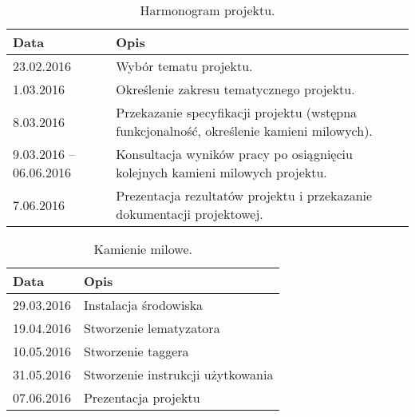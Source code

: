 \begin{table}[H]
	\centering
	\caption{Harmonogram projektu.}
	\smallskip
	\begin{tabular}{p{4cm}p{8cm}}
		\toprule
		\textbf{Data}& \textbf{Opis} \\
		\midrule
		23.02.2016 & Wybór tematu projektu. \\
		1.03.2016 & Określenie zakresu tematycznego projektu. \\
		8.03.2016 & Przekazanie specyfikacji projektu (wstępna funkcjonalność, określenie kamieni milowych). \\
		9.03.2016 -- 06.06.2016 & Konsultacja wyników pracy po osiągnięciu kolejnych kamieni milowych projektu. \\
		7.06.2016 & Prezentacja rezultatów projektu i przekazanie dokumentacji projektowej. \\
		\bottomrule
	\end{tabular}
\end{table}

	\begin{table}[H]
	\centering
	\caption{Kamienie milowe.}
	\smallskip
	\begin{tabular}{p{4cm}p{8cm}}
		\toprule
		\textbf{Data}& \textbf{Opis} \\
		\midrule
		29.03.2016 & Instalacja środowiska \\
		19.04.2016 & Stworzenie lematyzatora \\
		10.05.2016 & Stworzenie taggera \\
		31.05.2016 & Stworzenie instrukcji użytkowania \\
		07.06.2016 & Prezentacja projektu \\
		\bottomrule
	\end{tabular}
\end{table}
